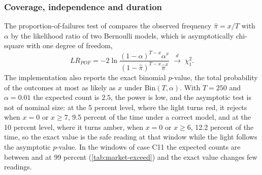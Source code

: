 \subsubsection{Coverage, independence and duration}
The proportion-of-failures test of \citet{market:kupiec1995} compares the observed frequency $\widehat\pi=x/T$ with $\alpha$ by the likelihood ratio of
two Bernoulli models, which is asymptotically chi-square with one degree of freedom,
\begin{equation}
LR_{POF}=-2\ln\frac{(1-\alpha)^{T-x}\alpha^{x}}{(1-\widehat\pi)^{T-x}\widehat\pi^{x}}\;\overset{d}{\longrightarrow}\;\chi^2_1.
\label{eq:mk-pof}
\end{equation}
The implementation also reports the exact binomial $p$-value, the total probability of the outcomes at most as likely as $x$ under
$\mathrm{Bin}(T,\alpha)$. With $T=250$ and $\alpha=0.01$ the expected count is $2.5$, the power is low, and the asymptotic test is not of nominal size:
at the 5 percent level, where the light turns red, it rejects when $x=0$ or $x\ge7$, 9.5 percent of the time under a correct model, and at the 10 percent level, where
it turns amber, when $x=0$ or $x\ge6$, 12.2 percent of the time, so the exact value is the safe reading at that window
while the light follows the asymptotic $p$-value. In the windows of case C11 the expected counts are between \mkExpMixed{} and \mkExpCalm{} at 99 percent
(\cref{tab:market-exceed}) and the exact value changes few readings.

